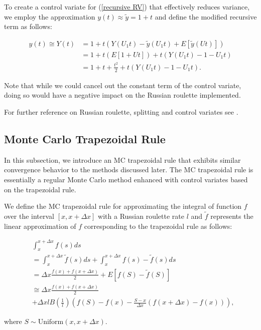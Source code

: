 \documentclass[a4paper,12pt]{article}
\begin{document}
\begin{example} \label{ex:CV}
  To create a control variate for (\ref{recursive RV}) that
  effectively reduces variance, we employ the approximation
  $y(t) \approx \tilde{y} =1+t$ and define the modified recursive term as follows:

  \begin{align}
    y(t) \cong Y(t) & = 1 + t(Y(U_{1}t) - \tilde{y}(U_{1}t) + E[\tilde{y}(Ut)])     \\
                    & = 1 + t \left( E[1 + Ut]  \right) + t(Y(U_{1}t) - 1 - U_{1}t) \\
                    & = 1 + t + \frac{t^2}{2} + t(Y(U_{1}t) - 1 - U_{1}t).
  \end{align}

  Note that while we could cancel out the constant term
  of the control variate, doing so would have a negative impact
  on the Russian roulette implemented.
\end{example}

\begin{related}[MC modification]
  For further reference on Russian roulette, splitting and control variates
  see \cite{veach_robust_1997}.
\end{related}

\subsection{Monte Carlo Trapezoidal Rule}

In this subsection, we introduce an MC trapezoidal rule that
exhibits similar convergence behavior to the methods discussed later.
The MC trapezoidal rule is essentially a regular Monte Carlo method
enhanced with control variates based on the trapezoidal rule.

\begin{definition}
  We define the MC trapezoidal rule for approximating the integral
  of function $f$ over the interval $[x, x+\Delta x]$ with a Russian roulette rate
  $l$ and $\tilde{f}$ represents the linear approximation of $f$ corresponding
  to the trapezoidal rule as follows:

  \begin{align}
     & \int_{x}^{x+\Delta x} f(s) ds                           \\
     & = \int_{x}^{x+\Delta x}  \tilde{f}(s) ds +
    \int_{x}^{x+\Delta x}  f(s) - \tilde{f}(s) ds              \\
     & = \Delta x \frac{f(x) + f(x+\Delta x)}{2}
    + E \left[f(S) - \tilde{f}(S)\right]                       \\
     & \cong \Delta x \frac{f(x) + f(x+\Delta x)}{2} \nonumber \\
     & + \Delta x l B\left( \frac{1}{l}\right)
    \left(f(S) - f(x) - \frac{S - x}{\Delta x}
    \left(f(x+\Delta x) - f(x)\right) \right), \label{eq:MCtrap}
  \end{align}

  where $S \sim \text{Uniform}(x,x+\Delta x)$.
\end{definition}
\end{document}
